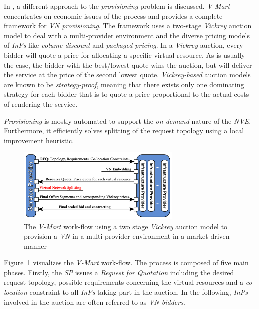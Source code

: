 \documentclass[prodmode,acmtomccap]{acmlarge}
\begin{document}
In , a different approach to the \emph{provisioning} problem is discussed. \emph{V-Mart} concentrates on economic issues of the 
process and provides a complete framework for \emph{VN provisioning}.
The framework uses a two-stage \emph{Vickrey} auction model to deal with a multi-provider environment and the diverse pricing models of \emph{InPs} like 
\emph{volume discount} and \emph{packaged pricing}. In a \emph{Vickrey} auction, every bidder will quote a price for allocating a specific virtual resource. As is usually the case, 
the bidder with the best/lowest quote wins the auction, but will deliver the service at the price of the second lowest quote. \emph{Vickrey-based} auction models are known to be \emph{strategy-proof},
meaning that there exists only one dominating strategy for each bidder that is to quote a price proportional to the actual costs of rendering the service.

\emph{Provisioning} is mostly automated to support the \emph{on-demand} nature of the \emph{NVE}. Furthermore, it
efficiently solves splitting of the request topology using a local improvement heuristic.

\begin{figure}[htb]
	\centering
	\includegraphics[width=0.7\textwidth]{vmart}
	\caption{The \emph{V-Mart} work-flow using a two stage \emph{Vickrey} auction model to provision a \emph{VN} in a multi-provider environment in a market-driven manner}
	\label{fig7}
\end{figure}

Figure~\ref{fig7} visualizes the \emph{V-Mart} work-flow. The process is composed of five main phases. 
Firstly, the \emph{SP} issues a \emph{Request for Quotation} including the desired request
topology, possible requirements concerning the virtual resources and a \emph{co-location} constraint to all \emph{InPs} taking part in the auction. In the following, \emph{InPs} involved in the auction
are often referred to as \emph{VN bidders}.
\end{document}
